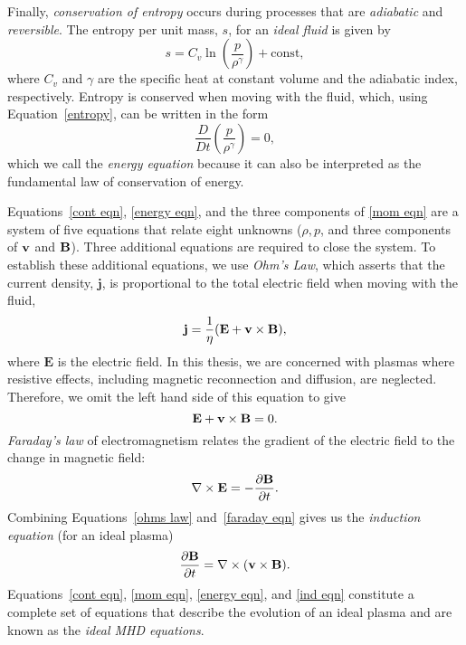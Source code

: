 Finally, \textit{conservation of entropy} occurs during processes that are \textit{adiabatic} and \textit{reversible}. The entropy per unit mass, $s$, for an \textit{ideal fluid} is given by
\begin{equation}
	s = C_v\ln\left(\frac{p}{\rho^\gamma}\right) + \text{const}, \label{entropy}
\end{equation}
where $C_v$ and $\gamma$ are the specific heat at constant volume and the adiabatic index, respectively. Entropy is conserved when moving with the fluid, which, using Equation~\eqref{entropy}, can be written in the form
\begin{equation}
\frac{D}{Dt}\left(\frac{p}{\rho^\gamma}\right) = 0, \label{energy eqn}
\end{equation}
which we call the \textit{energy equation} because it can also be interpreted as the fundamental law of conservation of energy.

Equations~\eqref{cont eqn}, \eqref{energy eqn}, and the three components of \eqref{mom eqn} are a system of five equations that relate eight unknowns ($\rho, p$, and three components of $\mathbf{v}$ and $\mathbf{B}$). Three additional equations are required to close the system. To establish these additional equations, we use \textit{Ohm's Law}, which asserts that the current density, $\mathbf{j}$, is proportional to the total electric field when moving with the fluid,
\begin{equation}
	\mathbf{j} = \frac{1}{\eta}(\mathbf{E} + \mathbf{v}\times\mathbf{B}),
\end{equation}
where $\mathbf{E}$ is the electric field. In this thesis, we are concerned with plasmas where resistive effects, including magnetic reconnection and diffusion, are neglected. Therefore, we omit the left hand side of this equation to give
\begin{equation}
\mathbf{E} + \mathbf{v}\times\mathbf{B} = 0. \label{ohms law}
\end{equation}
\textit{Faraday's law} of electromagnetism relates the gradient of the electric field to the change in magnetic field:
\begin{equation}
	\nabla\times\mathbf{E} = -\frac{\partial\mathbf{B}}{\partial t}. \label{faraday eqn}
\end{equation}
Combining Equations~\eqref{ohms law} and~\eqref{faraday eqn} gives us the \textit{induction equation} (for an ideal plasma)
\begin{equation}
	\frac{\partial\mathbf{B}}{\partial t} = \nabla\times(\mathbf{v}\times\mathbf{B}). \label{ind eqn}
\end{equation}
Equations~\eqref{cont eqn}, \eqref{mom eqn}, \eqref{energy eqn}, and \eqref{ind eqn} constitute a complete set of equations that describe the evolution of an ideal plasma and are known as the \textit{ideal MHD equations}.

